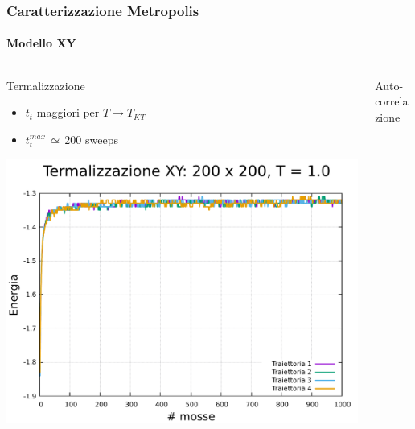 
\begin{frame}
    \frametitle{Caratterizzazione Metropolis}
    \framesubtitle{Modello XY}

    \begin{columns}
        \begin{column}{0.33\textwidth}
            \begin{block}{Termalizzazione}

                \begin{itemize}[itemsep=0.5em, label=$\diamond$]
                    \item $t_{t}$ maggiori per $T \to T_{KT}$
                    \item $t_{t}^{max}\,\simeq\,200$ sweeps
                \end{itemize}

                \vspace{0.5cm}

                \centering
                \includegraphics[width=\textwidth]{../ModelloXY/analisi/term/graphTerm/term_200_1.0.pdf}
            
            \end{block}
        \end{column}
    
        \begin{column}{0.33\textwidth}
            \begin{block}{Auto-correlazione}


\end{block}
\end{column}
\end{columns}
\end{frame}
